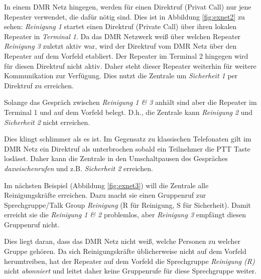 In einem DMR Netz hingegen, werden für einen Direktruf (Privat Call) nur jene Repeater verwendet, die dafür nötig sind. Dies ist in Abbildung \ref{fig:exnet2} zu sehen: \emph{Reinigung 1} startet einen Direktruf (Private Call) über ihren lokalen Repeater in \emph{Terminal 1}. Da das DMR Netzwerk weiß über welchen Repeater \emph{Reinigung 3} zuletzt aktiv war, wird der Direktruf vom DMR Netz über den Repeater auf dem Vorfeld etabliert. Der Repeater im Terminal 2 hingegen wird für diesen Direktruf nicht aktiv. Daher steht dieser Repeater weiterhin für weitere Kommunikation zur Verfügung. Dies nutzt die Zentrale um \emph{Sicherheit 1} per Direktruf zu erreichen. 

Solange das Gespräch zwischen \emph{Reinigung 1 \& 3} anhält sind aber die Repeater im Terminal 1 und auf dem Vorfeld belegt. D.h., die Zentrale kann \emph{Reinigung 2} und \emph{Sicherheit 2} nicht erreichen. 

Dies klingt schlimmer als es ist. Im Gegensatz zu klassischen Telefonaten gilt im DMR Netz ein Direktruf als unterbrochen sobald ein Teilnehmer die PTT Taste loslässt. Daher kann die Zentrale in den Umschaltpausen des Gespräches \emph{dazwischenrufen} und z.B. \emph{Sicherheit 2} erreichen. 

Im nächsten Beispiel (Abbildung \ref{fig:exnet3}) will die Zentrale alle Reinigungskräfte erreichen. Dazu macht sie einen Gruppenruf zur Sprechgruppe/Talk Group \emph{Reinigung} (R für Reinigung, S für Sicherheit). Damit erreicht sie die \emph{Reinigung 1 \& 2} problemlos, aber \emph{Reinigung 3} empfängt diesen Gruppenruf nicht. 

Dies liegt daran, dass das DMR Netz nicht weiß, welche Personen zu welcher Gruppe gehören. Da sich Reinigungskräfte üblicherweise nicht auf dem Vorfeld herumtreiben, hat der Repeater auf dem Vorfeld die Sprechgruppe \emph{Reinigung (R)} nicht \emph{abonniert} und leitet daher keine Gruppenrufe für diese Sprechgruppe weiter. 

